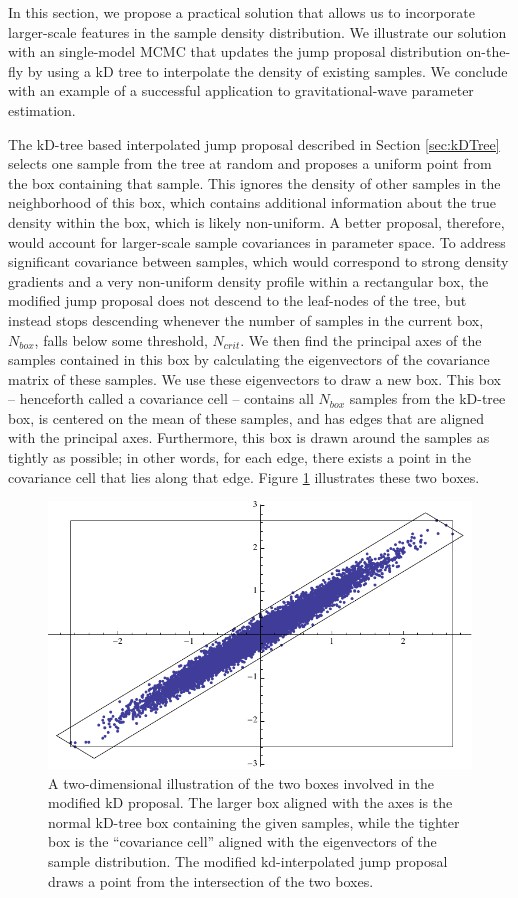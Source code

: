 \documentclass{iopart}
\begin{document}
In this section, we propose a practical solution that allows us to incorporate larger-scale features in the sample density distribution.  We illustrate our solution with an single-model MCMC that updates the jump proposal distribution on-the-fly by using a kD tree to interpolate the density of existing samples.  We conclude with an example of a successful application to gravitational-wave parameter estimation.

The kD-tree based interpolated jump proposal described in Section \ref{sec:kDTree} selects one sample from the tree at random and proposes a uniform point from the box containing that sample.  This ignores the density of other samples in the neighborhood of this box, which contains additional information about the true density within the box, which is likely non-uniform.  A better proposal, therefore, would account for larger-scale sample covariances in parameter space.  To address significant covariance between samples, which would correspond to strong density gradients and a very non-uniform density profile within a rectangular box, the modified jump proposal does not descend to the leaf-nodes of the tree, but instead stops descending whenever the number of samples in the current box, $N_{box}$, falls below some threshold, $N_{crit}$. We then find the principal axes of the samples
contained in this box by calculating the eigenvectors of the covariance matrix of these samples. We use these eigenvectors to draw a new box. This box -- henceforth called a covariance cell -- contains all $N_{box}$ samples from the kD-tree box, is centered on the mean of these samples, and has edges that are aligned with the principal axes. Furthermore, this box is drawn around the samples as tightly as possible; in other words, for each edge, there exists a point in the covariance cell that lies along that edge. Figure \ref{fig:PCC} illustrates these two boxes.

\begin{figure}
  \includegraphics[width=0.8\columnwidth]{PCC}
  \caption{\label{fig:PCC} A two-dimensional illustration of the two
    boxes involved in the modified kD proposal.  The larger box
    aligned with the axes is the normal kD-tree box containing the
    given samples, while the tighter box is the ``covariance cell'' aligned with the eigenvectors of the sample distribution.  The modified kd-interpolated jump proposal draws a point from the intersection of the two boxes. }
\end{figure}
\end{document}
